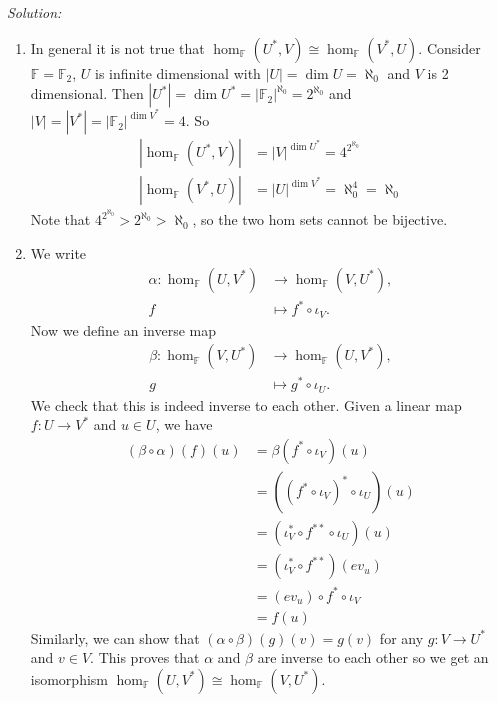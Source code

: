 \documentclass[a4paper, 12pt]{article}
\newenvironment{solution}
    {\textit{Solution:}}
    {}
\begin{document}
\begin{solution}
\begin{enumerate}[(1)]
\item In general it is not true that \(\hom_\mathbb{F}(U^*,V)\cong \hom_\mathbb{F}(V^*,U)\). Consider \(\mathbb{F}=\mathbb{F}_2\), \(U\) is infinite dimensional with \(|U|=\dim U=\aleph_0\) and 
      \(V\) is 2 dimensional. Then \(|U^*|=\dim U^*=|\mathbb{F}_2|^{\aleph_0}=2^{\aleph_0}\) and \(|V|=|V^*|=|\mathbb{F}_2|^{\dim V^*}=4\). So 
	  \begin{align*}
		|\hom_\mathbb{F}(U^*,V)|&=|V|^{\dim U^*}=4^{2^{\aleph_0}}\\ 
		|\hom_\mathbb{F}(V^*,U)|&=|U|^{\dim V^*}=\aleph_0^4=\aleph_0
	  \end{align*}
	  Note that \(4^{2^{\aleph_0}}>2^{\aleph_0}>\aleph_0\), so the two hom sets cannot be bijective.
\item We write 
\begin{align*}
	\alpha: \hom_\mathbb{F}(U,V^*) &\rightarrow \hom_\mathbb{F}(V,U^*),\\
	                             f &\mapsto f^*\circ \iota_V.
\end{align*}
Now we define an inverse map 
\begin{align*}
	\beta:\hom_\mathbb{F}(V,U^*) &\rightarrow \hom_\mathbb{F}(U,V^*),\\ 
	                                 g &\mapsto g^*\circ \iota_U.
\end{align*}
We check that this is indeed inverse to each other. Given a linear map \(f:U\rightarrow V^* \) and \(u\in U\), we have 
\begin{align*}
	(\beta\circ \alpha)(f)(u) & =\beta(f^*\circ \iota_V)(u)\\ 
	                          & =((f^*\circ \iota_V)^*\circ \iota_U)(u)\\ 
							  & =(\iota_V^*\circ f^{**}\circ \iota_U)(u)\\ 
							  & =(\iota_V^*\circ f^{**})(ev_u)\\ 
							  & =(ev_u)\circ f^*\circ \iota_V\\ 
							  & =f(u)
\end{align*}
Similarly, we can show that \((\alpha\circ \beta)(g)(v)=g(v)\) for any \(g:V\rightarrow U^*\) and \(v\in V\). This proves that \(\alpha\) and \(\beta\) are inverse to each other so we get an 
isomorphism \(\hom_\mathbb{F}(U,V^*)\cong \hom_\mathbb{F}(V,U^*)\).
\end{enumerate}
\end{solution}
\end{document}
